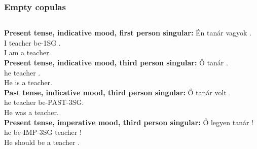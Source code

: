 \documentclass{beamer}
\begin{document}
\begin{frame}
\frametitle{Empty copulas}
\begin{columns}
\textbf{Present tense, indicative mood, first person singular:
}\label{sg1}
\gll \'En tan\'ar vagyok .\\
I teacher be-1SG .\\
\trans I am a teacher.\\

\textbf{Present tense, indicative mood, third person singular:
}
\gll \H{O} tan\'ar .\\
he teacher .\\
\trans He is a teacher.\\

\textbf{Past tense, indicative mood, third person singular:
}
\gll \H{O} tan\'ar volt .\\
he teacher be-PAST-3SG.\\
\trans He was a teacher.\\

\textbf{Present tense, imperative mood, third person singular:
}
\label{imp}
\gll \H{O} legyen tan\'ar !\\
he be-IMP-3SG teacher !\\
\trans He should be a teacher .
\end{columns}
\end{frame}
\end{document}
